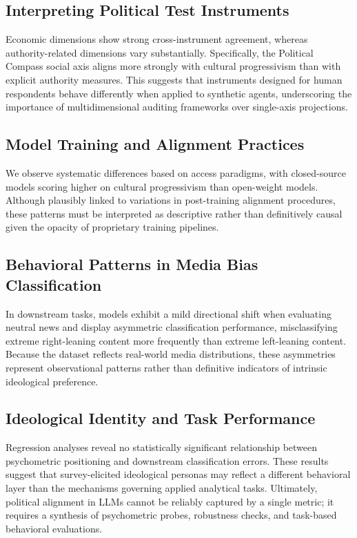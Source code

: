 \documentclass[11pt]{article}
\begin{document}
\subsection{Interpreting Political Test Instruments}
Economic dimensions show strong cross-instrument agreement, whereas authority-related dimensions vary substantially. Specifically, the Political Compass social axis aligns more strongly with cultural progressivism than with explicit authority measures. This suggests that instruments designed for human respondents behave differently when applied to synthetic agents, underscoring the importance of multidimensional auditing frameworks over single-axis projections.

\subsection{Model Training and Alignment Practices}
We observe systematic differences based on access paradigms, with closed-source models scoring higher on cultural progressivism than open-weight models. Although plausibly linked to variations in post-training alignment procedures, these patterns must be interpreted as descriptive rather than definitively causal given the opacity of proprietary training pipelines.

\subsection{Behavioral Patterns in Media Bias Classification}
In downstream tasks, models exhibit a mild directional shift when evaluating neutral news and display asymmetric classification performance, misclassifying extreme right-leaning content more frequently than extreme left-leaning content. Because the dataset reflects real-world media distributions, these asymmetries represent observational patterns rather than definitive indicators of intrinsic ideological preference.

\subsection{Ideological Identity and Task Performance}
Regression analyses reveal no statistically significant relationship between psychometric positioning and downstream classification errors. These results suggest that survey-elicited ideological personas may reflect a different behavioral layer than the mechanisms governing applied analytical tasks. Ultimately, political alignment in LLMs cannot be reliably captured by a single metric; it requires a synthesis of psychometric probes, robustness checks, and task-based behavioral evaluations.
\end{document}
